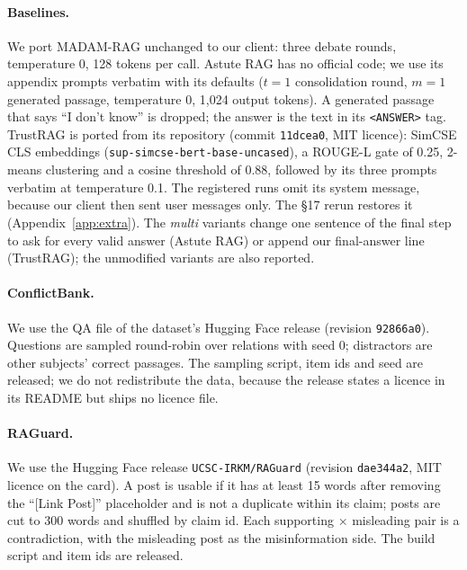 \paragraph{Baselines.} We port MADAM-RAG unchanged to our client: three debate rounds, temperature 0, 128 tokens
per call. Astute RAG has no official code; we use its appendix prompts verbatim with its defaults
($t{=}1$ consolidation round, $m{=}1$ generated passage, temperature 0, 1,024 output tokens). A generated
passage that says ``I don't know'' is dropped; the answer is the text in its \texttt{<ANSWER>} tag. TrustRAG is
ported from its repository (commit \texttt{11dcea0}, MIT licence): SimCSE CLS embeddings
(\texttt{sup-simcse-bert-base-uncased}), a ROUGE-L gate of 0.25, 2-means clustering and a cosine threshold of 0.88,
followed by its three prompts verbatim at temperature 0.1. The registered runs omit its system message, because our client then sent
user messages only. The \S17 rerun restores it (Appendix~\ref{app:extra}). The \emph{multi} variants change one sentence of the final step to ask for every valid answer
(Astute RAG) or append our final-answer line (TrustRAG); the unmodified variants are also reported.

\paragraph{ConflictBank.} We use the QA file of the dataset's Hugging Face release (revision \texttt{92866a0}). Questions are sampled round-robin over relations with seed 0; distractors are other subjects' correct passages. The
sampling script, item ids and seed are released; we do not redistribute the data, because the release states
a licence in its README but ships no licence file.

\paragraph{RAGuard.} We use the Hugging Face release \texttt{UCSC-IRKM/RAGuard} (revision \texttt{dae344a2}, MIT
licence on the card). A post is usable if it has at least 15 words after removing the ``[Link Post]'' placeholder and is
not a duplicate within its claim; posts are cut to 300 words and shuffled by claim id. Each supporting $\times$ misleading
pair is a contradiction, with the misleading post as the misinformation side. The build script and item ids are
released.

